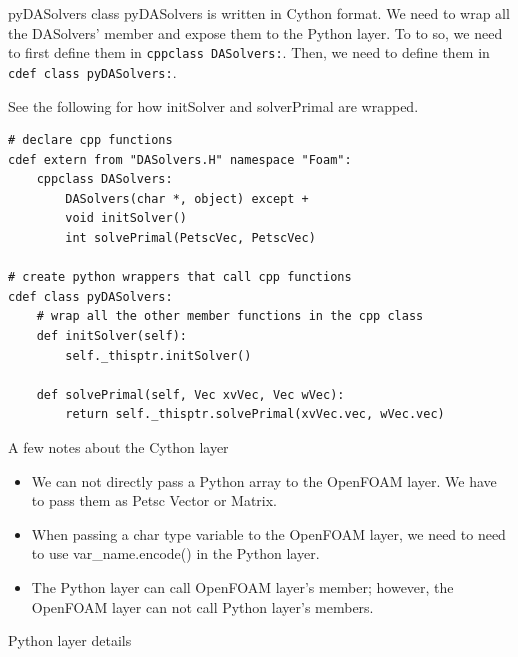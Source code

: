 \documentclass{bredelebeamer}
\begin{document}
\begin{frame}[fragile]{pyDASolvers class}
pyDASolvers is written in Cython format. We need to wrap all the DASolvers' member and expose them to the Python layer. To to so, we need to first define them in \texttt{cppclass DASolvers:}. Then, we need to define them in \texttt{cdef class pyDASolvers:}. 

See the following for how initSolver and solverPrimal are wrapped.

\footnotesize
\lstset{ language=python }
\begin{lstlisting}
# declare cpp functions
cdef extern from "DASolvers.H" namespace "Foam":
    cppclass DASolvers:
        DASolvers(char *, object) except +
        void initSolver()
        int solvePrimal(PetscVec, PetscVec)

# create python wrappers that call cpp functions
cdef class pyDASolvers:
    # wrap all the other member functions in the cpp class
    def initSolver(self):
        self._thisptr.initSolver()

    def solvePrimal(self, Vec xvVec, Vec wVec):
        return self._thisptr.solvePrimal(xvVec.vec, wVec.vec)
\end{lstlisting}
\normalsize
\end{frame}

\begin{frame}[fragile]{A few notes about the Cython layer}


\begin{itemize}
  \setlength\itemsep{0.5em}
 \item We can not directly pass a Python array to the OpenFOAM layer. We have to pass them as Petsc Vector or Matrix.
 \item When passing a char type variable to the OpenFOAM layer, we need to need to use var\_name.encode() in the Python layer.
 \item The Python layer can call OpenFOAM layer's member; however, the OpenFOAM layer can not call Python layer's members.
\end{itemize}
  
\end{frame}



\begin{frame}{}
  \center \Large Python layer details
\end{frame}
\end{document}
